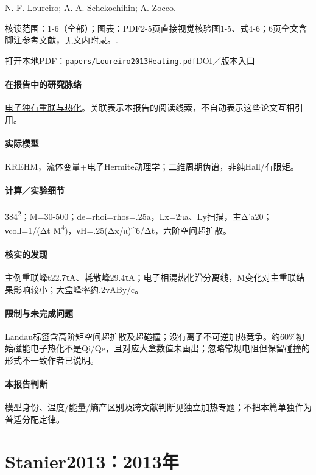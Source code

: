 N. F. Loureiro;  A. A. Schekochihin;  A. Zocco.

\textsf{核读范围：}1-6（全部）；\textsf{图表：}PDF2-5页直接视觉核验图1-5、式4-6；6页全文含脚注参考文献，无文内附录。.

\href{run:papers/Loureiro2013Heating.pdf}{打开本地PDF：\texttt{papers/Loureiro2013Heating.pdf}}\quad\href{https://doi.org/10.1103/PhysRevLett.111.025002}{DOI／版本入口}

\paragraph{在报告中的研究脉络}\hyperref[story:energy]{电子独有重联与热化}。关联表示本报告的阅读线索，不自动表示这些论文互相引用。

\paragraph{实际模型}KREHM，流体变量+电子Hermite动理学；二维周期伪谱，非纯Hall/有限矩。

\paragraph{计算／实验细节}384\textsuperscript{2}；M=30-500；de=rhoi=rhos=.25a，Lx=2πa、Ly扫描，主Δ'a20；νcoll=1/(Δt M\textsuperscript{4})，νH=.25(Δx/π)\textasciicircum{}6/Δt，六阶空间超扩散。

\paragraph{核实的发现}主例重联峰t22.7τA、耗散峰29.4τA；电子相混热化沿分离线，M变化对主重联结果影响较小；大盒峰率约.2vABy/c。

\paragraph{限制与未完成问题}Landau标签含高阶矩空间超扩散及超碰撞；没有离子不可逆加热竞争。约60\%初始磁能电子热化不是Qi/Qe，且对应大盒数值未画出；忽略常规电阻但保留碰撞的形式不一致作者已说明。

\paragraph{本报告判断}模型身份、温度/能量/熵产区别及跨文献判断见独立加热专题；不把本篇单独作为普适分配定律。

\section{Stanier2013：2013年}\label{paper:Stanier2013}

